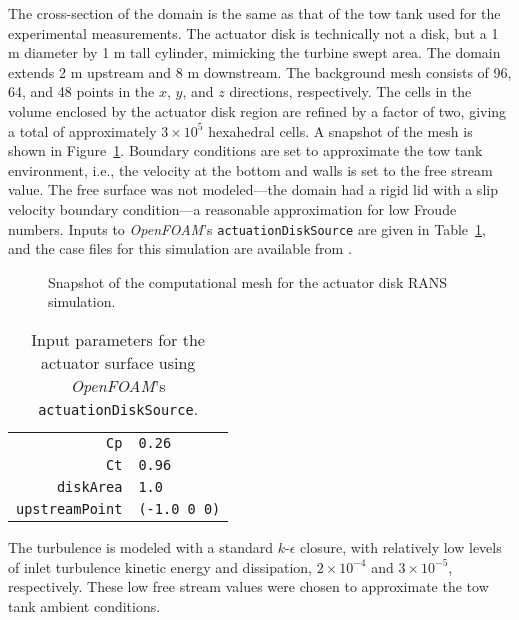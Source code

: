 The cross-section of the domain is the same as that of the tow tank used for the
experimental measurements. The actuator disk is technically not a disk, but a 1
m diameter by 1 m tall cylinder, mimicking the turbine swept area. The domain
extends 2 m upstream and 8 m downstream.  The background mesh consists of 96,
64, and 48 points in the $x$, $y$, and $z$ directions, respectively. The cells
in the volume enclosed by the actuator disk region are refined by a factor of
two, giving a total of  approximately $3 \times 10^5$ hexahedral cells. A
snapshot of the mesh is shown in Figure~\ref{fig-AD_mesh}. Boundary conditions
are set to approximate the tow tank environment, i.e., the velocity at the
bottom and walls is set to the free stream value. The free surface was not
modeled---the domain had a rigid lid with a slip velocity boundary condition---a
reasonable approximation for low Froude numbers. Inputs to \textit{OpenFOAM}'s
\texttt{actuationDiskSource} are given in Table~\ref{tab-AS}, and the case files
for this simulation are available from \cite{Bachant2014_OF-AS}.


\begin{figure}
    \centering
    \caption{Snapshot of the computational mesh for the actuator disk RANS 
        simulation.}
    \label{fig-AD_mesh}
\end{figure}


\begin{table}
    \begin{center}
        \begin{tabular}{r|l}
            \texttt{Cp} & \texttt{0.26} \\ 
            \texttt{Ct} & \texttt{0.96} \\ 
            \texttt{diskArea} & \texttt{1.0} \\ 
            \texttt{upstreamPoint} & \texttt{(-1.0 0 0)} \\ 
        \end{tabular} 
        \caption{Input parameters for the actuator surface using \textit{OpenFOAM}'s
            \texttt{actuationDiskSource}.}
    \end{center}
    \label{tab-AS}
\end{table}

The turbulence is modeled with a standard $k$-$\epsilon$ closure, with
relatively low levels of inlet turbulence kinetic energy and dissipation, $2
\times 10^{-4}$ and $3 \times 10^{-5}$, respectively. These low free stream
values were chosen to approximate the tow tank ambient conditions.

